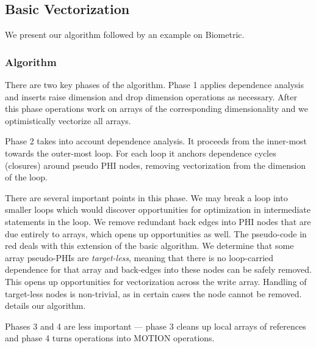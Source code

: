 \subsection{Basic Vectorization}
\label{sec:basic_vectorization}

We present our algorithm followed by an example on Biometric. 

\subsubsection{Algorithm}

There are two key phases of the algorithm. Phase 1 applies dependence analysis and inserts
raise dimension and drop dimension operations as necessary. After this phase operations work
on arrays of the corresponding dimensionality and we optimistically vectorize all arrays.

Phase 2 takes into account dependence analysis. It proceeds from the inner-most towards the outer-most 
loop. For each loop it anchors dependence cycles (closures) around pseudo PHI nodes, removing vectorization 
from the dimension of the loop.

There are several important points in this phase. We may break a loop into smaller loops which would discover opportunities 
for optimization in intermediate statements in the loop. We remove redundant back edges into PHI nodes that are 
due entirely to arrays, which opens up opportunities as well. The pseudo-code in red deals with this extension
of the basic algorithm. We determine that some array pseudo-PHIs are \emph{target-less}, meaning
that there is no loop-carried dependence for that array and back-edges into these nodes can be safely removed. 
This opens up opportunities for vectorization across the write array. Handling of target-less nodes is non-trivial, 
as in certain cases the node cannot be removed.  details our algorithm. 


Phases 3 and 4 are less important --- phase 3 cleans up local arrays of references and phase 4 turns operations into MOTION operations.


